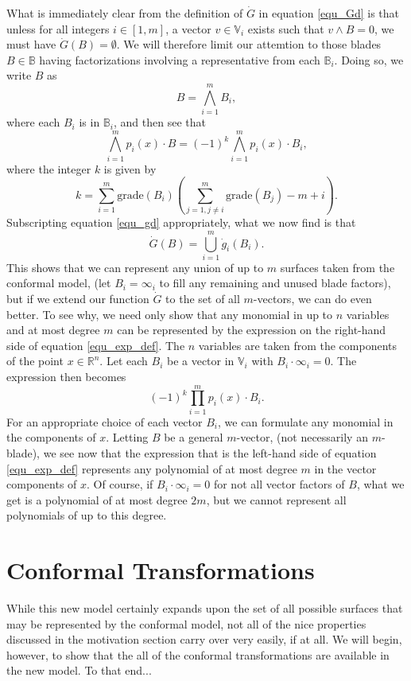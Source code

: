 \documentclass{ecgd-l}
\theoremstyle{definition}
\theoremstyle{remark}
\numberwithin{equation}{section}
\newcommand{\R}{\mathbb{R}}
\newcommand{\B}{\mathbb{B}}
\newcommand{\V}{\mathbb{V}}
\newcommand{\gd}{\dot{g}}
\newcommand{\Gd}{\dot{G}}
\newcommand{\nvai}{\infty}
\newcommand{\grade}{\mbox{grade}}
\begin{document}
What is immediately clear from the definition of $\Gd$ in equation \eqref{equ_Gd}
is that unless for all integers $i\in[1,m]$, a vector
$v\in\V_i$ exists such that $v\wedge B=0$, we must have $\Gd(B)=\emptyset$.  We will therefore limit our attemtion
to those blades $B\in\B$ having factorizations involving a representative from each $\B_i$.
Doing so, we write $B$ as
\begin{equation*}
B = \bigwedge_{i=1}^m B_i,
\end{equation*}
where each $B_i$ is in $\B_i$, and then see that
\begin{equation}\label{equ_exp_def}
\bigwedge_{i=1}^m p_i(x)\cdot B = (-1)^k\bigwedge_{i=1}^m p_i(x)\cdot B_i,
\end{equation}
where the integer $k$ is given by
\begin{equation*}
k=\sum_{i=1}^m \grade(B_i)\left(\sum_{j=1,j\neq i}^m \grade(B_j)-m+i\right).
\end{equation*}
Subscripting equation \eqref{equ_gd} appropriately, what we now find is that
\begin{equation*}
\Gd(B) = \bigcup_{i=1}^m\gd_i(B_i).
\end{equation*}
This shows that we can represent any union of up to $m$ surfaces taken from the conformal model,
(let $B_i=\nvai_i$ to fill any remaining and unused blade factors),
but if we extend our function $\Gd$ to the set of all $m$-vectors, we can do even better.
To see why, we need only show that any monomial in up to $n$ variables and at most
degree $m$ can be represented by the expression on the right-hand side of equation \eqref{equ_exp_def}.
The $n$ variables are taken from the components of the point $x\in\R^n$.  Let each $B_i$ be a vector in $\V_i$
with $B_i\cdot\nvai_i=0$.
The expression then becomes
\begin{equation*}
(-1)^k\prod_{i=1}^m p_i(x)\cdot B_i.
\end{equation*}
For an appropriate choice of each vector $B_i$, we can formulate any monomial in the components of $x$.
Letting $B$ be a general $m$-vector, (not necessarily an $m$-blade), we see now that the expression
that is the left-hand side of equation \eqref{equ_exp_def} represents any polynomial of at most degree $m$
in the vector components of $x$.  Of course, if $B_i\cdot\nvai_i=0$ for not all vector factors of $B$, what
we get is a polynomial of at most degree $2m$, but we cannot represent all polynomials of up to this degree.

\section{Conformal Transformations}

While this new model certainly expands upon the set of all possible surfaces that may be represented by
the conformal model, not all of the nice properties discussed in the motivation section carry over very easily, if at all.
We will begin, however, to show that the all of the conformal transformations are available in the new model.
To that end...


\end{document}
